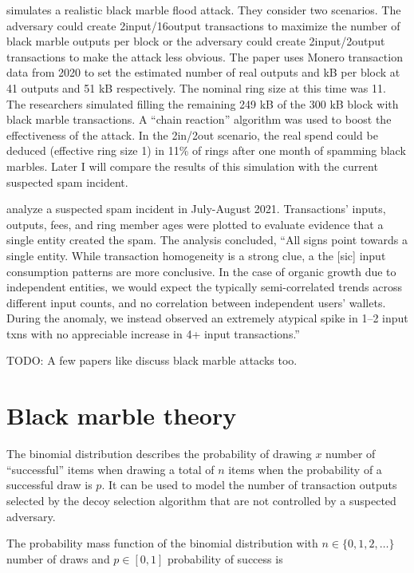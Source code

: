 \documentclass[usletter,11pt,english,openany]{article}
\begin{document}
\cite{Chervinski2021} simulates a realistic black marble flood attack.
They consider two scenarios. The adversary could create 2input/16output
transactions to maximize the number of black marble outputs per block
or the adversary could create 2input/2output transactions to make
the attack less obvious. The paper uses Monero transaction data from
2020 to set the estimated number of real outputs and kB per block
at 41 outputs and 51 kB respectively. The nominal ring size at this
time was 11. The researchers simulated filling the remaining 249 kB
of the 300 kB block with black marble transactions. A ``chain reaction''
algorithm was used to boost the effectiveness of the attack. In the
2in/2out scenario, the real spend could be deduced (effective ring
size 1) in 11\% of rings after one month of spamming black marbles.
Later I will compare the results of this simulation with the current
suspected spam incident.

\cite{Krawiec-Thayer2021} analyze a suspected spam incident in July-August
2021. Transactions' inputs, outputs, fees, and ring member ages were
plotted to evaluate evidence that a single entity created the spam.
The analysis concluded, ``All signs point towards a single entity.
While transaction homogeneity is a strong clue, a the {[}sic{]} input
consumption patterns are more conclusive. In the case of organic growth
due to independent entities, we would expect the typically semi-correlated
trends across different input counts, and no correlation between independent
users\textquoteright{} wallets. During the anomaly, we instead observed
an extremely atypical spike in 1--2 input txns with no appreciable
increase in 4+ input transactions.''

TODO: A few papers like \cite{Ronge2021,Egger2022} discuss black
marble attacks too.

\section{Black marble theory}

The binomial distribution describes the probability of drawing $x$
number of ``successful'' items when drawing a total of $n$ items
when the probability of a successful draw is $p$. It can be used
to model the number of transaction outputs selected by the decoy selection
algorithm that are not controlled by a suspected adversary.

The probability mass function of the binomial distribution with $n\in\{0,1,2,\ldots\}$
number of draws and $p\in[0,1]$ probability of success is
\end{document}
